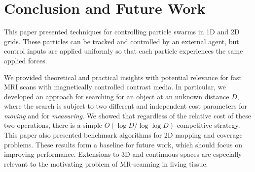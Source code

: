 \section{Conclusion and Future Work}\label{sec:conclusion}

This paper presented techniques for controlling particle swarms in 1D and 2D grids.
These particles can be tracked and controlled by an external agent, but control inputs are applied uniformly so that each particle experiences the same applied forces. 

We provided theoretical and practical insights  with potential relevance for fast MRI scans with magnetically controlled contrast media.
In particular, we developed an approach for searching for an object at an unknown distance $D$, where the search is subject to two different and independent cost parameters
for {\em moving} and for {\em measuring}. 
We showed that regardless of the relative cost of these two operations,
there is a simple $O(\log D/\log\log D)$-competitive strategy.
This paper also presented benchmark algorithms for 2D mapping and coverage problems.
These results form a baseline for future work, which should focus on improving performance. 
Extensions to 3D and continuous spaces are especially relevant to the motivating problem of MR-scanning in living tissue.